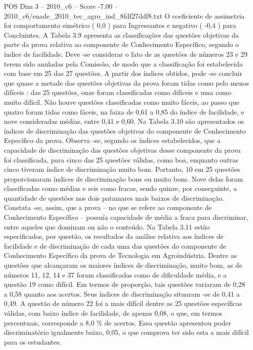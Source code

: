 \begin{textsample}{POS Dim 3 – 2010\_c6 – Score -7.00 – 2010\_c6/enade\_2010\_tec\_agro\_ind\_8fdf27ddf8.txt}
O coeficiente de assimetria foi comportamento simétrico ( 0,0 ) para Ingressantes e negativo ( -0,4 ) para Concluintes.
A Tabela 3.9 apresenta as classificações das questões objetivas da parte da prova relativa ao componente de Conhecimento Específico, segundo o índice de facilidade.
Deve -se considerar o fato de as questões de números 23 e 29 terem sido anuladas pela Comissão, de modo que a classificação foi estabelecida com base em 25 das 27 questões.
A partir dos índices obtidos, pode -se concluir que quase a metade das questões objetivas da prova foram tidas como pelo menos difíceis : das 25 questões, onze foram classificadas como difíceis e uma como muito difícil.
Não houve questões classificadas como muito fáceis, ao passo que quatro foram tidas como fáceis, na faixa de 0,61 a 0,85 do índice de facilidade, e nove consideradas médias, entre 0,41 e 0,60.
Na Tabela 3.10 são apresentados os índices de discriminação das questões objetivas do componente de Conhecimento Específico da prova.
Observa -se, segundo os índices estabelecidos, que a capacidade de discriminação das questões objetivas desse componente da prova foi classificada, para cinco das 25 questões válidas, como boa, enquanto outras cinco tiveram índice de discriminação muito bom.
Portanto, 10 em 25 questões proporcionaram índices de discriminação bons ou muito bons.
Nove delas foram classificadas como médias e seis como fracas, sendo quinze, por conseguinte, a quantidade de questões nos dois patamares mais baixos de discriminação.
Constata -se, assim, que a prova – no que se refere ao componente de Conhecimento Específico – possuía capacidade de média a fraca para discriminar, entre aqueles que dominam ou não o conteúdo.
Na Tabela 3.11 estão especificados, por questão, os resultados da análise relativa aos índices de facilidade e de discriminação de cada uma das questões do componente de Conhecimento Específico da prova de Tecnologia em Agroindústria.
Dentre as questões que alcançaram os maiores índices de discriminação, muito bom, as de números 11, 12, 14 e 37 foram classificadas como de dificuldade média, e a questão 19 como difícil.
Em termos de proporção, tais questões variaram de 0,28 a 0,58 quanto aos acertos.
Seus índices de discriminação situaram -se de 0,41 a 0,49.
A questão de número 22 foi a mais difícil dentre as 25 questões específicas válidas, com baixo índice de facilidade, de apenas 0,08, o que, em termos percentuais, corresponde a 8,0 \% de acertos.
Essa questão apresentou poder discriminatório igualmente baixo, 0,05, o que comprova ter sido esta a mais difícil para os estudantes.

\end{textsample}
